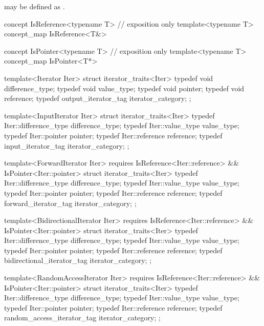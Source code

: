 \documentclass[american,twoside]{book}
\begin{document}
may be defined as .


\setcounter{Paras}{5}
\pnum
{}
\color{ccadd}
\begin{codeblock}
concept IsReference<typename T> { } // exposition only
template<typename T> concept_map IsReference<T&> { }

concept IsPointer<typename T> { } // exposition only
template<typename T> concept_map IsPointer<T*> { }

template<Iterator Iter> struct iterator_traits<Iter> {
  typedef void                             difference_type;
  typedef void                             value_type;
  typedef void                             pointer;
  typedef void                             reference;
  typedef output_iterator_tag              iterator_category;
};

template<InputIterator Iter> struct iterator_traits<Iter> {
  typedef Iter::difference_type            difference_type;
  typedef Iter::value_type                 value_type;
  typedef Iter::pointer                    pointer;
  typedef Iter::reference                  reference;
  typedef input_iterator_tag                   iterator_category;
};

template<ForwardIterator Iter> 
  requires IsReference<Iter::reference> && IsPointer<Iter::pointer>
  struct iterator_traits<Iter> {
    typedef Iter::difference_type            difference_type;
    typedef Iter::value_type                 value_type;
    typedef Iter::pointer                    pointer;
    typedef Iter::reference                  reference;
    typedef forward_iterator_tag                 iterator_category;
  };

template<BidirectionalIterator Iter> 
  requires IsReference<Iter::reference> && IsPointer<Iter::pointer>
  struct iterator_traits<Iter> {
    typedef Iter::difference_type            difference_type;
    typedef Iter::value_type                 value_type;
    typedef Iter::pointer                    pointer;
    typedef Iter::reference                  reference;
    typedef bidirectional_iterator_tag       iterator_category;
  };

template<RandomAccessIterator Iter> 
  requires IsReference<Iter::reference> && IsPointer<Iter::pointer>
  struct iterator_traits<Iter> {
    typedef Iter::difference_type            difference_type;
    typedef Iter::value_type                 value_type;
    typedef Iter::pointer                    pointer;
    typedef Iter::reference                  reference;
    typedef random_access_iterator_tag       iterator_category;
  };
\end{codeblock} 
\exitnote\
\color{black}
\end{document}
